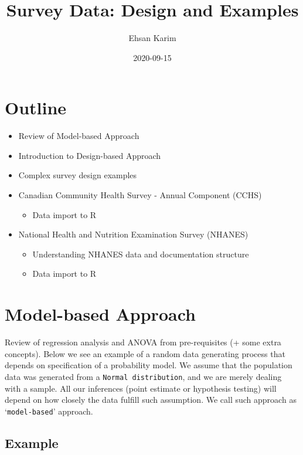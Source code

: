 \documentclass[
]{book}
\title{Survey Data: Design and Examples}
\author{Ehsan Karim}
\date{2020-09-15}
\providecommand{\tightlist}{%
  \setlength{\itemsep}{0pt}\setlength{\parskip}{0pt}}
\begin{document}
\maketitle

{
\setcounter{tocdepth}{1}
\tableofcontents
}
\hypertarget{outline}{%
\chapter{Outline}\label{outline}}

\begin{itemize}
\tightlist
\item
  Review of Model-based Approach
\item
  Introduction to Design-based Approach
\item
  Complex survey design examples
\item
  Canadian Community Health Survey - Annual Component (CCHS)

  \begin{itemize}
  \tightlist
  \item
    Data import to R
  \end{itemize}
\item
  National Health and Nutrition Examination Survey (NHANES)

  \begin{itemize}
  \tightlist
  \item
    Understanding NHANES data and documentation structure
  \item
    Data import to R
  \end{itemize}
\end{itemize}

\hypertarget{tab-3}{%
\chapter{Model-based Approach}\label{tab-3}}

Review of regression analysis and ANOVA from pre-requisites (+ some extra concepts). Below we see an example of a random data generating process that depends on specification of a probability model. We assume that the population data was generated from a \texttt{Normal\ distribution}, and we are merely dealing with a sample. All our inferences (point estimate or hypothesis testing) will depend on how closely the data fulfill such assumption. We call such approach as `\texttt{model-based}' approach.

\hypertarget{example}{%
\section{Example}\label{example}}
\end{document}
